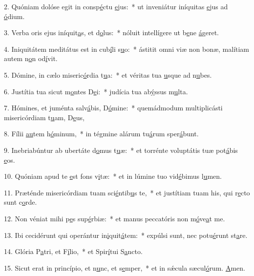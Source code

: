 2. Quóniam dolóse egit in consp\uline{é}ctu \uline{e}jus:~* ut inveniátur iníquitas \uline{e}jus ad \uline{ó}dium.\par 
3. Verba oris ejus iníquit\uline{a}s, et d\uline{o}lus:~* nóluit intellígere ut b\uline{e}ne \uline{á}geret.\par 
4. Iniquitátem meditátus est in cub\uline{í}li s\uline{u}o:~* ástitit omni viæ non bonæ, malítiam autem n\uline{o}n od\uline{í}vit.\par 
5. Dómine, in cælo miseric\uline{ó}rdia t\uline{u}a:~* et véritas tua \uline{u}sque ad n\uline{u}bes.\par 
6. Justítia tua sicut m\uline{o}ntes D\uline{e}i:~* judícia tua ab\uline{ý}ssus m\uline{u}lta.\par 
7. Hómines, et juménta salv\uline{á}bis, D\uline{ó}mine:~* quemádmodum multiplicásti misericórdiam t\uline{u}am, D\uline{e}us,\par 
8. Fílii \uline{au}tem h\uline{ó}minum,~* in tégmine alárum tu\uline{á}rum sper\uline{á}bunt.\par 
9. Inebriabúntur ab ubertáte d\uline{o}mus t\uline{u}æ:~* et torrénte voluptátis tuæ pot\uline{á}bis \uline{e}os.\par 
10. Quóniam apud te \uline{e}st fons v\uline{i}tæ:~* et in lúmine tuo vid\uline{é}bimus l\uline{u}men.\par 
11. Præténde misericórdiam tuam sci\uline{é}ntib\uline{u}s te,~* et justítiam tuam his, qui r\uline{e}cto sunt c\uline{o}rde.\par 
12. Non véniat mihi p\uline{e}s sup\uline{é}rbiæ:~* et manus peccatóris non m\uline{ó}ve\uline{a}t me.\par 
13. Ibi cecidérunt qui operántur in\uline{i}quit\uline{á}tem:~* expúlsi sunt, nec potu\uline{é}runt st\uline{a}re.\par 
14. Glória P\uline{a}tri, et F\uline{í}lio,~* et Spir\uline{í}tui S\uline{a}ncto.\par 
15. Sicut erat in princípio, et n\uline{u}nc, et s\uline{e}mper,~* et in sǽcula sæcul\uline{ó}rum. \uline{A}men.\par 
